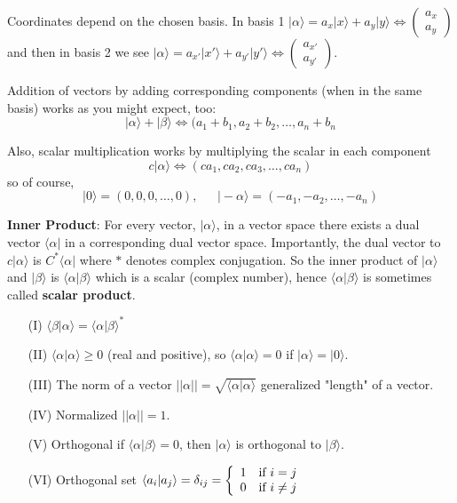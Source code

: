 \documentclass[english, 11pt]{article}
\newcommand{\bra}[1]{\langle #1 |}
\newcommand{\ket}[1]{| #1 \rangle}
\newcommand{\braket}[2]{\langle #1 | #2 \rangle}
\newcommand{\ka}{| \alpha \rangle}
\newcommand{\kb}{| \beta \rangle}
\newcommand{\mtx}[1]{\left(\begin{matrix}#1\end{matrix}\right)}
\begin{document}
        Coordinates depend on the chosen basis. In basis 1 $\ka = a_x\ket{x} + a_y\ket{y} \iff \left(\begin{matrix}a_x \\ a_y \end{matrix}\right)$ and then in basis 2 we see $\ka = a_{x'}\ket{x'} + a_{y'}\ket{y'} \iff \mtx{a_{x'} \\ a_{y'}}$. \newline

        Addition of vectors by adding corresponding components (when in the same basis) works as you might expect, too:
        \[ \ket{\alpha} + \ket{\beta} \iff (a_1 + b_1, a_2 + b_2, \hdots, a_n + b_n \]

        Also, scalar multiplication works by multiplying the scalar in each component
        \[ c\ka \iff (ca_1, ca_2, ca_3, \ldots, ca_n) \]
        so of course,
        \[ \ket{0} = (0, 0, 0, \ldots, 0),  \ \ \ \ \ \ \  \ket{-\alpha} = (-a_1, -a_2, \ldots, -a_n) \]

        {\bf Inner Product}: For every vector, $\ka$, in a vector space there exists a dual vector $\bra{\alpha}$ in a corresponding dual vector space. Importantly, the dual vector to $c\ka$ is $C^*\bra{\alpha}$ where $*$ denotes complex conjugation. So the inner product of $\ka$ and $\kb$ is $\braket{\alpha}{\beta}$ which is a scalar (complex number), hence $\braket{\alpha}{\beta}$ is sometimes called {\bf scalar product}.

        \begin{itemize}
          \item[(I)] $\braket{\beta}{\alpha} = \braket{\alpha}{\beta}^*$
          \item[(II)] $\braket{\alpha}{\alpha} \geq 0$ (real and positive), so $\braket{\alpha}{\alpha} = 0$ if $\ka = \ket{0}$.
          \item[(III)] The norm of a vector $||\alpha|| = \sqrt{\braket{\alpha}{\alpha}}$ generalized "length" of a vector.
          \item[(IV)] Normalized $||\alpha|| = 1$.
          \item[(V)] Orthogonal if $\braket{\alpha}{\beta} = 0$, then $\ka$ is orthogonal to $\kb$.
          \item[(VI)] Orthogonal set $\braket{a_i}{a_j} = \delta_{ij} = \piecewise{1}{if $i = j$}{0}{if $i \not = j$}$
        \end{itemize}
\end{document}
